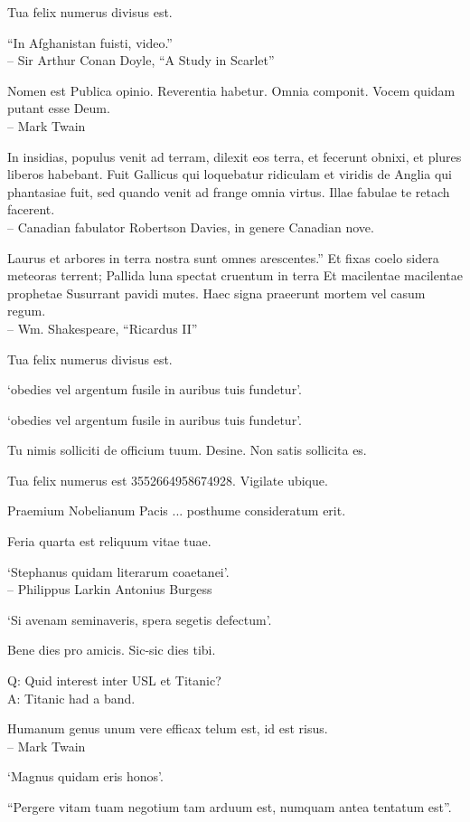\documentclass[titlepage,12pt]{memoir}
\begin{document}
Tua felix numerus divisus est.

 “In Afghanistan fuisti, video.”
\\-- Sir Arthur Conan Doyle, “A Study in Scarlet”

Nomen est Publica opinio. Reverentia habetur. Omnia componit.
Vocem quidam putant esse Deum.
\\-- Mark Twain

In insidias, populus venit ad terram, dilexit eos terra, et fecerunt
obnixi, et plures liberos habebant. Fuit Gallicus qui loquebatur ridiculam
et viridis de Anglia qui phantasiae fuit, sed quando venit ad
frange omnia virtus. Illae fabulae te retach facerent.
\\-- Canadian fabulator Robertson Davies, in genere Canadian
nove.

Laurus et arbores in terra nostra sunt omnes arescentes.”
Et fixas coelo sidera meteoras terrent;
Pallida luna spectat cruentum in terra
Et macilentae macilentae prophetae Susurrant pavidi mutes.
Haec signa praeerunt mortem vel casum regum.
\\-- Wm. Shakespeare, “Ricardus II”

Tua felix numerus divisus est.

‘obedies vel argentum fusile in auribus tuis fundetur’.

‘obedies vel argentum fusile in auribus tuis fundetur’.

Tu nimis solliciti de officium tuum. Desine. Non satis sollicita es.

Tua felix numerus est 3552664958674928. Vigilate ubique.

Praemium Nobelianum Pacis ... posthume consideratum erit.

Feria quarta est reliquum vitae tuae.

‘Stephanus quidam literarum coaetanei’.
\\-- Philippus Larkin Antonius Burgess

‘Si avenam seminaveris, spera segetis defectum’.

Bene dies pro amicis.
Sic-sic dies tibi.

Q: Quid interest inter USL et Titanic?\\
A: Titanic had a band.

Humanum genus unum vere efficax telum est, id est risus.
\\-- Mark Twain

‘Magnus quidam eris honos’.

“Pergere vitam tuam negotium tam arduum est, numquam antea tentatum est”.
\end{document}
